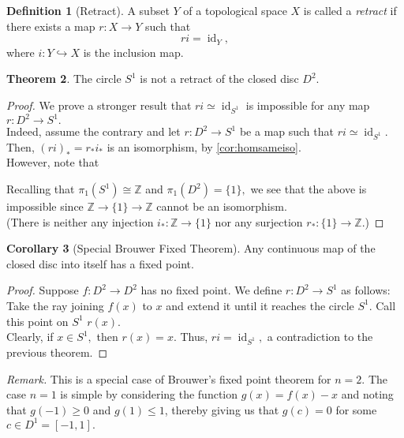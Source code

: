 \documentclass[12pt]{article}
\theoremstyle{definition}
\newtheorem{thm}{Theorem}
\numberwithin{thm}{section}
\newtheorem{defn}[thm]{Definition}
\newtheorem{cor}[thm]{Corollary}
\newcommand{\id}{\operatorname{id}}
\begin{document}
\begin{defn}[Retract]
	A subset $Y$ of a topological space $X$ is called a \emph{retract} if there exists a map $r:X \to Y$ such that
	\begin{equation*} 
		ri = \id_Y,
	\end{equation*}
	where $i:Y \hookrightarrow X$ is the inclusion map.
\end{defn}
\begin{thm}
	The circle $S^1$ is not a retract of the closed disc $D^2.$
\end{thm}
\begin{proof} 
	We prove a stronger result that $ri \simeq \id_{S^1}$ is impossible for any map $r:D^2 \to S^1.$\\
	Indeed, assume the contrary and let $r:D^2 \to S^1$ be a map such that $ri \simeq \id_{S^1}.$ Then, $(ri)_* = r_*i_*$ is an isomorphism, by \cref{cor:homsameiso}.\\
	However, note that 
	\begin{center}
	\end{center}
	Recalling that $\pi_1(S^1) \cong \mathbb{Z}$ and $\pi_1(D^2) = \{1\},$ we see that the above is impossible since $\mathbb{Z} \to \{1\} \to \mathbb{Z}$ cannot be an isomorphism. \\
	(There is neither any injection $i_* : \mathbb{Z} \to \{1\}$ nor any surjection $r_* : \{1\} \to \mathbb{Z}.$)
\end{proof}
\begin{cor}[Special Brouwer Fixed Theorem]
	Any continuous map of the closed disc into itself has a fixed point.
\end{cor}
\begin{proof} 
	Suppose $f:D^2 \to D^2$ has no fixed point. We define $r:D^2 \to S^1$ as follows:\\
	Take the ray joining $f(x)$ to $x$ and extend it until it reaches the circle $S^1.$ Call this point on $S^1$ $r(x).$\\
	Clearly, if $x \in S^1,$ then $r(x) = x.$ Thus, $ri = \id_{S^1},$ a contradiction to the previous theorem.
\end{proof}
\emph{Remark.} This is a special case of Brouwer's fixed point theorem for $n = 2.$ The case $n = 1$ is simple by considering the function $g(x) = f(x) - x$ and noting that $g(-1) \ge 0$ and $g(1) \le 1$, thereby giving us that $g(c) = 0$ for some $c \in D^1 = [-1, 1].$
\end{document}
